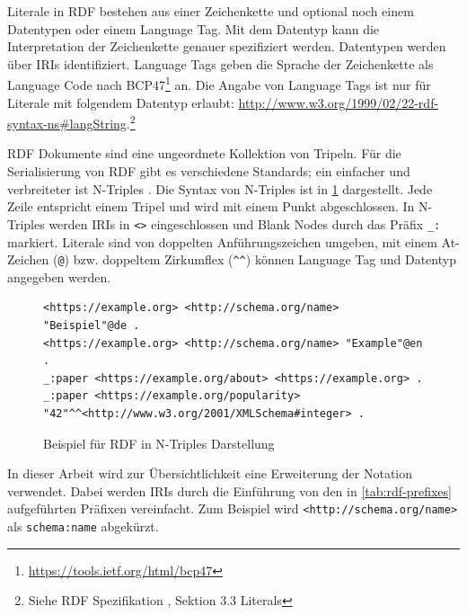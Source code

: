 Literale in RDF bestehen aus einer Zeichenkette und optional noch einem Datentypen oder einem Language Tag.
Mit dem Datentyp kann die Interpretation der Zeichenkette genauer spezifiziert werden.
Datentypen werden über IRIs identifiziert.
Language Tags geben die Sprache der Zeichenkette als Language Code nach BCP47\footnote{\url{https://tools.ietf.org/html/bcp47}} an.
Die Angabe von Language Tags ist nur für Literale mit folgendem Datentyp erlaubt: \url{http://www.w3.org/1999/02/22-rdf-syntax-ns#langString}.\footnote{Siehe RDF Spezifikation \cite{rdf-spec}, Sektion 3.3 Literals} 

RDF Dokumente sind eine ungeordnete Kollektion von Tripeln.
Für die Serialisierung von RDF gibt es verschiedene Standards; ein einfacher und verbreiteter ist N-Triples \cite{rdf-ntriples}.
Die Syntax von N-Triples ist in \cref{fig:rdf-sample} dargestellt.
Jede Zeile entspricht einem Tripel und wird mit einem Punkt abgeschlossen.
In N-Triples werden IRIs in \verb|<>| eingeschlossen und Blank Nodes durch das Präfix \verb|_:| markiert.
Literale sind von doppelten Anführungszeichen umgeben, mit einem At-Zeichen (\verb|@|) bzw. doppeltem Zirkumflex (\verb|^^|) können Language Tag und Datentyp angegeben werden.

\begin{figure}
  \begin{lstlisting}[language=SPARQL, breaklines=true]
<https://example.org> <http://schema.org/name> "Beispiel"@de .
<https://example.org> <http://schema.org/name> "Example"@en .
_:paper <https://example.org/about> <https://example.org> .
_:paper <https://example.org/popularity> "42"^^<http://www.w3.org/2001/XMLSchema#integer> .
  \end{lstlisting}
  \caption{Beispiel für RDF in N-Triples Darstellung}
  \label{fig:rdf-sample}
\end{figure}

In dieser Arbeit wird zur Übersichtlichkeit eine Erweiterung der Notation verwendet.
Dabei werden IRIs durch die Einführung von den in \cref{tab:rdf-prefixes} aufgeführten Präfixen vereinfacht.
Zum Beispiel wird \verb|<http://schema.org/name>| als \verb|schema:name| abgekürzt. 

